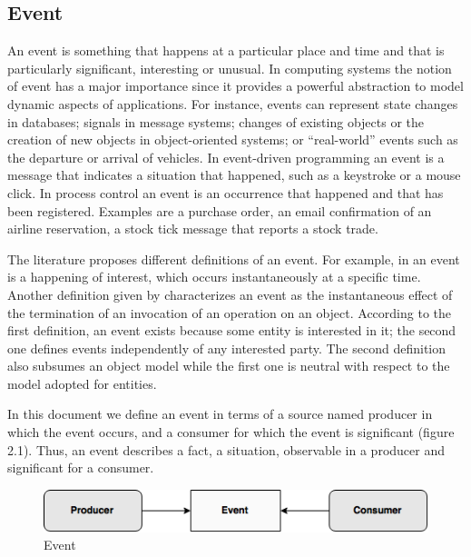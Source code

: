  \subsection{Event}
 An event is something that happens at a particular place and time and that is particularly significant, interesting or unusual. In computing systems the notion of event has a major importance since it provides a powerful abstraction to model dynamic aspects of applications. For instance, events can represent state changes in databases; signals in message systems; changes of existing objects or the creation of new objects in object-oriented systems; or “real-world” events such as the departure or arrival of vehicles. In event-driven programming an event is a message that indicates a situation that happened, such as a keystroke or a mouse click. In process control an event is an occurrence that happened and that has been registered.  Examples are a purchase order, an email confirmation of an airline reservation, a stock tick message that reports a stock trade.
 
 The literature proposes different definitions of an event. For example, in \cite{Mansouri97gem} an event is a happening of interest, which occurs instantaneously at a specific time. Another definition given by \cite{Rosenblum97} characterizes an event as the instantaneous effect of the termination of an invocation of an operation on an object. According to the first definition, an event exists because some entity is interested in it; the second one defines events independently of any interested party. The second definition also subsumes an object model while the first one is neutral with respect to the model adopted for entities. 

In this document we define an event in terms of a source named producer in which the event occurs, and a consumer for which the event is significant (figure 2.1). Thus, an event describes a fact, a situation, observable in a producer and significant for a consumer.
\begin{figure}[H]
  \begin{center}
    \includegraphics[scale=0.65]{chap3/images/event.png}
  \end{center}
  \caption{Event}
  \label{fig:event}
\end{figure}
